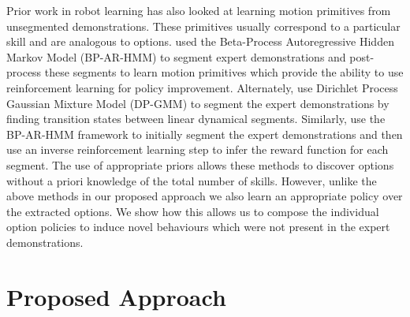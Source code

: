 \documentclass{article} %
\begin{document}

Prior work in robot learning has also looked at learning motion primitives from unsegmented demonstrations. These primitives usually correspond to a particular skill and are analogous to options.
\cite{niekum2011clustering} used the Beta-Process Autoregressive Hidden Markov Model (BP-AR-HMM) to segment expert demonstrations and post-process these segments to learn motion primitives which provide the ability to use reinforcement learning for policy improvement.
Alternately, \cite{krishnan2018transition} use Dirichlet Process Gaussian Mixture Model (DP-GMM) to segment the expert demonstrations by finding transition states between linear dynamical segments.
Similarly, \cite{ranchod2015nonparametric} use the BP-AR-HMM framework to initially segment the expert demonstrations and then use an inverse reinforcement learning step to infer the reward function for each segment.
The use of appropriate priors allows these methods to discover options without a priori knowledge of the total number of skills.
However, unlike the above methods in our proposed approach we also learn an appropriate policy over the extracted options. We show how this allows us to compose the individual option policies to induce novel behaviours which were not present in the expert demonstrations. 


\section{Proposed Approach}
\label{sec:proposed_approach}
\end{document}
